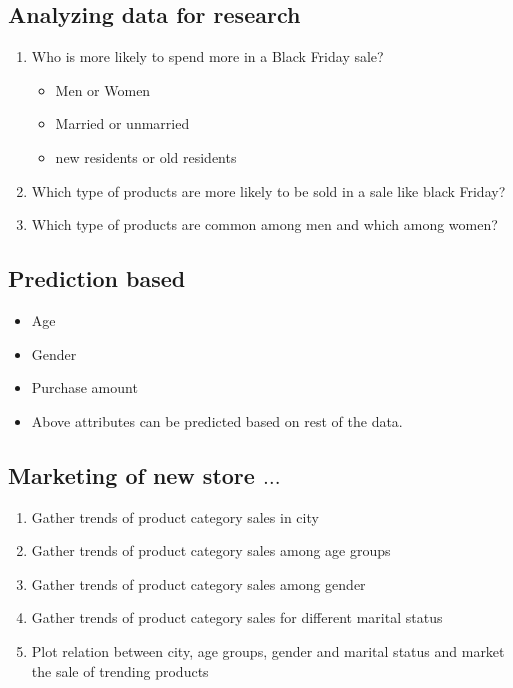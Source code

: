 \documentclass[paper=letter, fontsize=12pt]{article}
\begin{document}
\subsection{Analyzing data for research}
\begin{enumerate}
    \item Who is more likely to spend more in a Black Friday sale?
        \begin{itemize}
            \item Men or Women
            \item Married or unmarried
            \item new residents or old residents
        \end{itemize}
    \item Which type of products are more likely to be sold in a sale like black Friday?
    \item Which type of products are common among men and which among women?
\end{enumerate}

\subsection{Prediction based}
\begin{itemize}
    \item Age
    \item Gender
    \item Purchase amount
    \item[] Above attributes can be predicted based on rest of the data.
\end{itemize}

\subsection{Marketing of new store $ \dots $}
\begin{enumerate}
	\item Gather trends of product category sales in city
	\item Gather trends of product category sales among age groups
	\item Gather trends of product category sales among gender
	\item Gather trends of product category sales for different marital status
	\item Plot relation between city, age groups, gender and marital status and market the sale of trending products
\end{enumerate}
\end{document}
